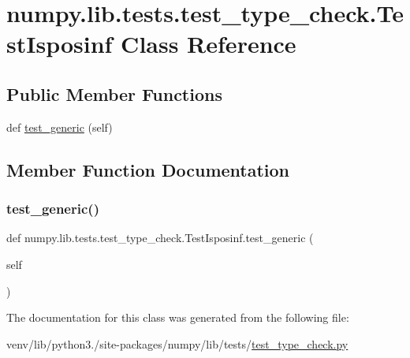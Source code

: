 \hypertarget{classnumpy_1_1lib_1_1tests_1_1test__type__check_1_1TestIsposinf}{}\section{numpy.\+lib.\+tests.\+test\+\_\+type\+\_\+check.\+Test\+Isposinf Class Reference}
\label{classnumpy_1_1lib_1_1tests_1_1test__type__check_1_1TestIsposinf}
\subsection*{Public Member Functions}
\begin{DoxyCompactItemize}
\item 
def \hyperlink{classnumpy_1_1lib_1_1tests_1_1test__type__check_1_1TestIsposinf_aeeb880ea3daee78bd30a65cbda9deb65}{test\+\_\+generic} (self)
\end{DoxyCompactItemize}


\subsection{Member Function Documentation}
\mbox{\label{classnumpy_1_1lib_1_1tests_1_1test__type__check_1_1TestIsposinf_aeeb880ea3daee78bd30a65cbda9deb65}} 
\subsubsection{\texorpdfstring{test\+\_\+generic()}{test\_generic()}}
{\footnotesize\ttfamily def numpy.\+lib.\+tests.\+test\+\_\+type\+\_\+check.\+Test\+Isposinf.\+test\+\_\+generic (\begin{DoxyParamCaption}\item[{}]{self }\end{DoxyParamCaption})}



The documentation for this class was generated from the following file\+:\begin{DoxyCompactItemize}
\item 
venv/lib/python3./site-\/packages/numpy/lib/tests/\hyperlink{test__type__check_8py}{test\+\_\+type\+\_\+check.\+py}\end{DoxyCompactItemize}
